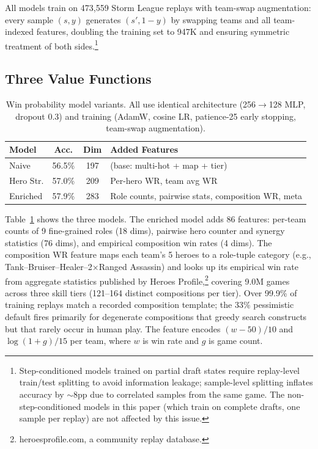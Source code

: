 \documentclass[conference]{IEEEtran}
\begin{document}
All models train on 473,559 Storm League replays with team-swap augmentation: every sample $(s, y)$ generates $(s', 1\!-\!y)$ by swapping teams and all team-indexed features, doubling the training set to 947K and ensuring symmetric treatment of both sides.\footnote{Step-conditioned models trained on partial draft states require replay-level train/test splitting to avoid information leakage; sample-level splitting inflates accuracy by $\sim$8pp due to correlated samples from the same game. The non-step-conditioned models in this paper (which train on complete drafts, one sample per replay) are not affected by this issue.}

\subsection{Three Value Functions}

\begin{table}[t]
\centering
\caption{Win probability model variants. All use identical architecture (256$\to$128 MLP, dropout 0.3) and training (AdamW, cosine LR, patience-25 early stopping, team-swap augmentation).}
\label{tab:models}
\begin{tabular}{lccp{3.1cm}}
\toprule
Model & Acc. & Dim & Added Features \\
\midrule
Naive & 56.5\% & 197 & (base: multi-hot + map + tier) \\
Hero Str. & 57.0\% & 209 & Per-hero WR, team avg WR \\
Enriched & 57.9\% & 283 & Role counts, pairwise stats, composition WR, meta \\
\bottomrule
\end{tabular}
\end{table}

Table~\ref{tab:models} shows the three models. The enriched model adds 86 features: per-team counts of 9 fine-grained roles (18 dims), pairwise hero counter and synergy statistics (76 dims), and empirical composition win rates (4 dims). The composition WR feature maps each team's 5 heroes to a role-tuple category (e.g., Tank--Bruiser--Healer--2$\times$Ranged Assassin) and looks up its empirical win rate from aggregate statistics published by Heroes Profile,\footnote{heroesprofile.com, a community replay database.} covering 9.0M games across three skill tiers (121--164 distinct compositions per tier). Over 99.9\% of training replays match a recorded composition template; the 33\% pessimistic default fires primarily for degenerate compositions that greedy search constructs but that rarely occur in human play. The feature encodes $(w\!-\!50)/10$ and $\log(1\!+\!g)/15$ per team, where $w$ is win rate and $g$ is game count.
\end{document}
